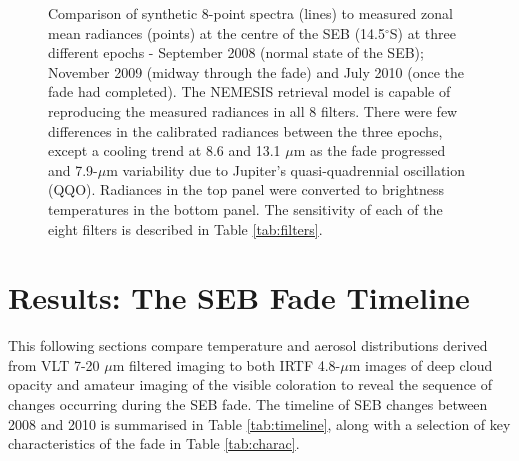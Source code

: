 \documentclass[final,5p,times,twocolumn,authoryear]{elsarticle}
\begin{document}
\begin{figure}[tbp]
\centering
{}
\caption{Comparison of synthetic 8-point spectra (lines) to measured zonal mean radiances (points) at the centre of the SEB (14.5$^\circ$S) at three different epochs - September 2008 (normal state of the SEB); November 2009 (midway through the fade) and July 2010 (once the fade had completed).  The NEMESIS retrieval model is capable of reproducing the measured radiances in all 8 filters.  There were few differences in the calibrated radiances between the three epochs, except a cooling trend at 8.6 and 13.1 $\mu$m as the fade progressed and 7.9-$\mu$m variability due to Jupiter's quasi-quadrennial oscillation (QQO).  Radiances in the top panel were converted to brightness temperatures in the bottom panel.  The sensitivity of each of the eight filters is described in Table \ref{tab:filters}.}
\label{visirspx}
\end{figure}


\section{Results:  The SEB Fade Timeline}
\label{results}

This following sections compare temperature and aerosol distributions derived from VLT 7-20 $\mu$m filtered imaging to both IRTF 4.8-$\mu$m images of deep cloud opacity and amateur imaging of the visible coloration to reveal the sequence of changes occurring during the SEB fade.  The timeline of SEB changes between 2008 and 2010 is summarised in Table \ref{tab:timeline}, along with a selection of key characteristics of the fade in Table \ref{tab:charac}. 
\end{document}
